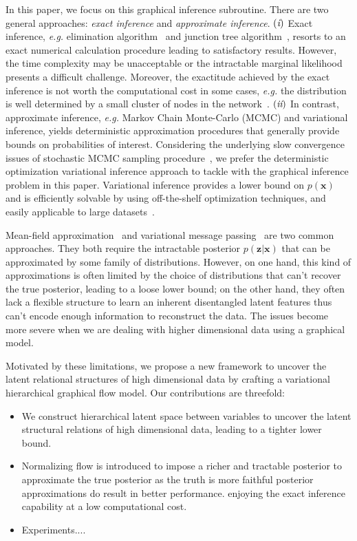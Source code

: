 \documentclass{article} %
\newcommand{\RN}[1]{%
	\textup{\lowercase\expandafter{\it \romannumeral#1}}%
}
\begin{document}
In this paper, we focus on this graphical inference subroutine. There are two general approaches: \textit{exact inference} and \textit{approximate inference}. $(\RN{1})$ Exact inference, \textit{e.g.} elimination algorithm~\cite{sanner2012symbolic} and junction tree algorithm~\cite{kahle2008junction}, resorts to an exact numerical calculation procedure leading to satisfactory results. However, the time complexity may be unacceptable or the intractable marginal likelihood presents a difficult challenge. Moreover, the exactitude achieved by the exact inference is not worth the computational cost in some cases, \textit{e.g.} the distribution is well determined by a small cluster of nodes in the network~\cite{jordan1999introduction}. $(\RN{2})$ In contrast, approximate inference, \textit{e.g.} Markov Chain Monte-Carlo (MCMC) and variational inference, yields deterministic approximation procedures that generally provide bounds on probabilities of interest. Considering the underlying slow convergence issues of stochastic MCMC sampling procedure~\cite{salimans2015markov}, we prefer the deterministic optimization variational inference approach to tackle with the graphical inference problem in this paper. Variational inference provides a lower bound on $p(\mathbf{x})$ and is efficiently solvable by using off-the-shelf optimization techniques, and easily applicable to large datasets~\cite{liu2016stein,kingma2013auto}.

Mean-field approximation~\cite{xing2012generalized} and variational message passing~\cite{winn2005variational} are two common approaches. They both require the intractable posterior $p(\mathbf{z}|\mathbf{x})$ that can be approximated by some family of distributions. However, on one hand, this kind of approximations is often limited by the choice of distributions that can't recover the true posterior, leading to a loose lower bound; on the other hand, they often lack a flexible structure to learn an inherent disentangled latent features thus can't encode enough information to reconstruct the data. The issues become more severe when we are dealing with higher dimensional data using a graphical model. 

Motivated by these limitations, we propose a new framework to uncover the latent relational structures of high dimensional data by crafting a variational hierarchical graphical flow model. Our contributions are threefold:
\begin{itemize}
    \item We construct hierarchical latent space between variables to uncover the latent structural relations of high dimensional data, leading to a tighter lower bound.
    \item Normalizing flow is introduced to impose a richer and tractable posterior to approximate the true posterior as the truth is more faithful posterior approximations do result in better performance.  enjoying the exact inference capability at a low computational cost.
    \item Experiments....
\end{itemize}
\end{document}
